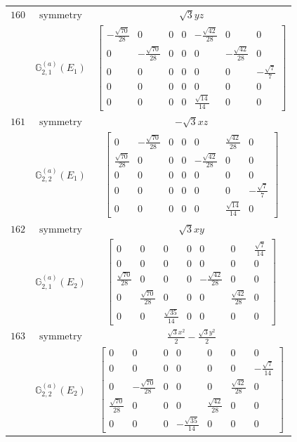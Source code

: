 \documentclass[fleqn,8pt,landscape]{jsarticle}
\begin{document}
\begin{longtable}{ccc}
$ 160 $ & $ \text{symmetry} $ & $ \sqrt{3} y z $ \\
$  $ & $ \mathbb{G}_{2,1}^{(a)}(E_{1}) $ & $ \begin{bmatrix} - \frac{\sqrt{70}}{28} & 0 & 0 & 0 & - \frac{\sqrt{42}}{28} & 0 & 0 \\ 0 & - \frac{\sqrt{70}}{28} & 0 & 0 & 0 & - \frac{\sqrt{42}}{28} & 0 \\ 0 & 0 & 0 & 0 & 0 & 0 & - \frac{\sqrt{7}}{7} \\ 0 & 0 & 0 & 0 & 0 & 0 & 0 \\ 0 & 0 & 0 & 0 & \frac{\sqrt{14}}{14} & 0 & 0 \end{bmatrix} $ \\ \hline
$ 161 $ & $ \text{symmetry} $ & $ - \sqrt{3} x z $ \\
$  $ & $ \mathbb{G}_{2,2}^{(a)}(E_{1}) $ & $ \begin{bmatrix} 0 & - \frac{\sqrt{70}}{28} & 0 & 0 & 0 & \frac{\sqrt{42}}{28} & 0 \\ \frac{\sqrt{70}}{28} & 0 & 0 & 0 & - \frac{\sqrt{42}}{28} & 0 & 0 \\ 0 & 0 & 0 & 0 & 0 & 0 & 0 \\ 0 & 0 & 0 & 0 & 0 & 0 & - \frac{\sqrt{7}}{7} \\ 0 & 0 & 0 & 0 & 0 & \frac{\sqrt{14}}{14} & 0 \end{bmatrix} $ \\ \hline
$ 162 $ & $ \text{symmetry} $ & $ \sqrt{3} x y $ \\
$  $ & $ \mathbb{G}_{2,1}^{(a)}(E_{2}) $ & $ \begin{bmatrix} 0 & 0 & 0 & 0 & 0 & 0 & \frac{\sqrt{7}}{14} \\ 0 & 0 & 0 & 0 & 0 & 0 & 0 \\ \frac{\sqrt{70}}{28} & 0 & 0 & 0 & - \frac{\sqrt{42}}{28} & 0 & 0 \\ 0 & \frac{\sqrt{70}}{28} & 0 & 0 & 0 & \frac{\sqrt{42}}{28} & 0 \\ 0 & 0 & \frac{\sqrt{35}}{14} & 0 & 0 & 0 & 0 \end{bmatrix} $ \\ \hline
$ 163 $ & $ \text{symmetry} $ & $ \frac{\sqrt{3} x^{2}}{2} - \frac{\sqrt{3} y^{2}}{2} $ \\
$  $ & $ \mathbb{G}_{2,2}^{(a)}(E_{2}) $ & $ \begin{bmatrix} 0 & 0 & 0 & 0 & 0 & 0 & 0 \\ 0 & 0 & 0 & 0 & 0 & 0 & - \frac{\sqrt{7}}{14} \\ 0 & - \frac{\sqrt{70}}{28} & 0 & 0 & 0 & \frac{\sqrt{42}}{28} & 0 \\ \frac{\sqrt{70}}{28} & 0 & 0 & 0 & \frac{\sqrt{42}}{28} & 0 & 0 \\ 0 & 0 & 0 & - \frac{\sqrt{35}}{14} & 0 & 0 & 0 \end{bmatrix} $ \\ \hline

\end{longtable}
\end{document}

